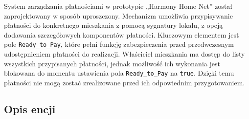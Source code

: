 System zarządzania płatnościami w prototypie „Harmony Home Net” został zaprojektowany w sposób uproszczony. Mechanizm umożliwia przypisywanie płatności do konkretnego mieszkania z pomocą sygnatury lokalu, z opcją dodawania szczegółowych komponentów płatności. Kluczowym elementem jest pole \texttt{Ready\_to\_Pay}, które pełni funkcję zabezpieczenia przed przedwczesnym udostępnieniem płatności do realizacji. Właściciel mieszkania ma dostęp do listy wszystkich przypisanych płatności, jednak możliwość ich wykonania jest blokowana do momentu ustawienia pola \texttt{Ready\_to\_Pay} na \texttt{true}. Dzięki temu płatności nie mogą zostać zrealizowane przed ich odpowiednim przygotowaniem.

\subsection{Opis encji}


